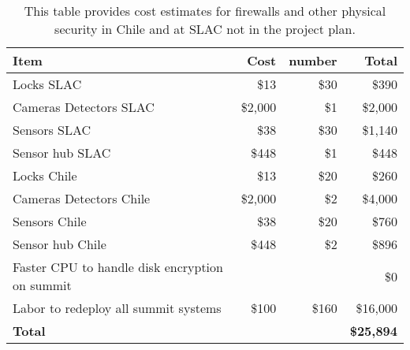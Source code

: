 \tiny \begin{longtable} {|p{}|r|r|r|} \caption{This table provides cost estimates for firewalls and other physical security in Chile and at SLAC not in the project plan. \label{tab:firewalls}}\\ 
\hline 
\textbf{Item}&\textbf{Cost}&\textbf{number}&\textbf{Total} \\ \hline
{Locks SLAC}&{\$13}&{\$30}&{\$390} \\ \hline
{Cameras Detectors  SLAC}&{\$2,000}&{\$1}&{\$2,000} \\ \hline
{Sensors SLAC}&{\$38}&{\$30}&{\$1,140} \\ \hline
{Sensor hub SLAC}&{\$448}&{\$1}&{\$448} \\ \hline
{Locks Chile}&{\$13}&{\$20}&{\$260} \\ \hline
{Cameras Detectors Chile}&{\$2,000}&{\$2}&{\$4,000} \\ \hline
{Sensors Chile}&{\$38}&{\$20}&{\$760} \\ \hline
{Sensor hub Chile}&{\$448}&{\$2}&{\$896} \\ \hline
{Faster CPU to handle disk encryption on summit}&{}&{}&{\$0} \\ \hline
{Labor to redeploy all summit systems}&{\$100}&{\$160}&{\$16,000} \\ \hline
\textbf{Total }&\textbf{}&\textbf{}&\textbf{\$25,894} \\ \hline
\end{longtable} \normalsize
